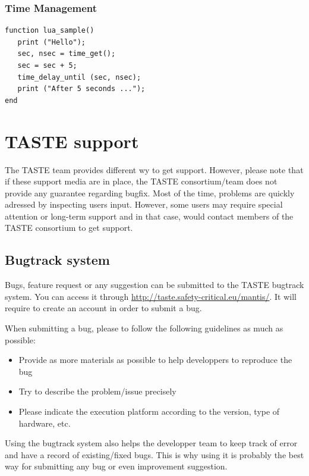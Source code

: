 \documentclass[11pt]{book}
\begin{document}
{      \subsection{Time Management}
\begin{lstlisting}
function lua_sample()
   print ("Hello");
   sec, nsec = time_get();
   sec = sec + 5;
   time_delay_until (sec, nsec);
   print ("After 5 seconds ...");
end
\end{lstlisting}


\chapter{TASTE support}
The TASTE team provides different wy to get support. However, please note that
if these support media are in place, the TASTE consortium/team does not provide
any guarantee regarding bugfix. Most of the time, problems are quickly adressed
by inspecting users input. However, some users may require special attention or
long-term support and in that case, would contact members of the TASTE
consortium to get support.

   \section{Bugtrack system}
   Bugs, feature request or any suggestion can be submitted to the TASTE
   bugtrack system. You can access it through
   \url{http://taste.safety-critical.eu/mantis/}. It will require to create an
   account in order to submit a bug.

   When submitting a bug, please to follow the following guidelines as much as
   possible:
   \begin{itemize}
      \item
         Provide as more materials as possible to help developpers to reproduce
         the bug
      \item
         Try to describe the problem/issue precisely
      \item
         Please indicate the execution platform according to the version, type
         of hardware, etc.
   \end{itemize}

   Using the bugtrack system also helps the developper team to keep track of
   error and have a record of existing/fixed bugs. This is why using it is
   probably the best way for submitting any bug or even improvement suggestion.

}
\end{document}
